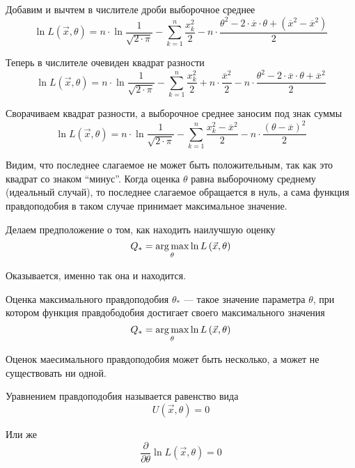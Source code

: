 \begin{example}
    Добавим и вычтем в числителе дроби выборочное среднее
    $$\ln{L\left( \vec{x},\theta \right)}
        =n\cdot\ln{\frac{1}{\sqrt{2\cdot\pi}}}
            -\sum_{k=1}^n \frac{x_k^2}{2}
            -n\cdot\frac{\theta^2
                -2\cdot\overline{x}\cdot\theta
                +\left(\overline{x}^2-\overline{x}^2\right)}{2}$$

    Теперь в числителе очевиден квадрат разности
    $$\ln{L\left( \vec{x},\theta \right)}
        =n\cdot\ln{\frac{1}{\sqrt{2\cdot\pi}}}
            -\sum_{k=1}^n \frac{x_k^2}{2}
            +n\cdot\frac{\overline{x}^2}{2}
            -n\cdot\frac{\theta^2
                -2\cdot\overline{x}\cdot\theta
                +\overline{x}^2}{2}$$

    Сворачиваем квадрат разности,
    а выборочное среднее заносим под знак суммы
    $$\ln{L\left( \vec{x},\theta \right)}
        =n\cdot\ln{\frac{1}{\sqrt{2\cdot\pi}}}
            -\sum_{k=1}^n \frac{x_k^2-\overline{x}^2}{2}
            -n\cdot\frac{\left(\theta-\overline{x}\right)^2}{2}$$

    Видим, что последнее слагаемое не может быть положительным,
    так как это квадрат со знаком ``минус''.
    Когда оценка $\theta$ равна выборочному среднему (идеальный случай),
    то последнее слагаемое обращается в нуль, а сама функция правдоподобия
    в таком случае принимает максимальное значение.

    Делаем предположение о том, как находить наилучшую оценку
    $$Q_*=\underset{\theta}{\operatorname{arg\,max}}\ln{L\left( \vec{x},\theta \right)}$$

    Оказывается, именно так она и находится.
\end{example}

\begin{definition}
    Оценка максимального правдоподобия
    $\theta_*$ --- такое значение параметра $\theta$,
    при котором функция правдободобия достигает своего максимального значения
    $$Q_*=\underset{\theta}{\operatorname{arg\,max}}\ln{L\left( \vec{x},\theta \right)}$$
\end{definition}

\begin{remark}
    Оценок маесимального правдоподобия может быть несколько,
    а может не существовать ни одной.
\end{remark}

\begin{definition}
    Уравнением правдоподобия называется равенство вида
    $$U\left( \vec{x},\theta \right)=0$$

    Или же
    $$\frac{\partial}{\partial\theta}\ln{L\left( \vec{x},\theta \right)}=0$$
\end{definition}

